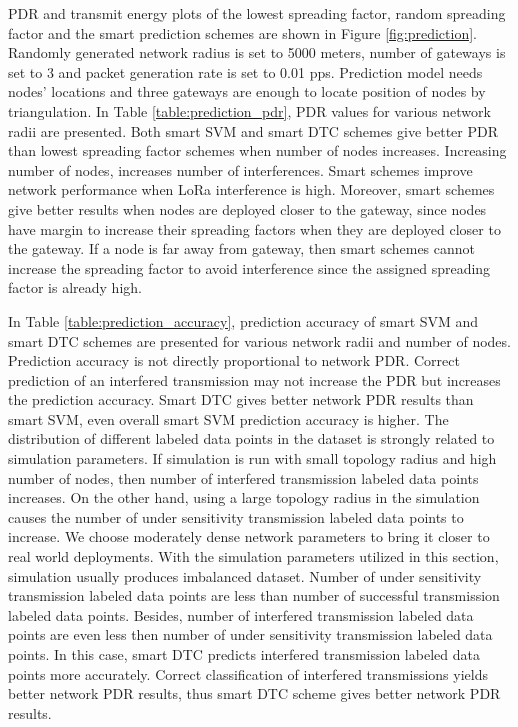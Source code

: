 PDR and transmit energy plots of the lowest spreading factor, random spreading factor and the smart prediction schemes are shown in Figure \ref{fig:prediction}. Randomly generated network radius is set to 5000 meters, number of gateways is set to 3 and packet generation rate is set to 0.01 pps. Prediction model needs nodes' locations and three gateways are enough to locate position of nodes by triangulation. In Table \ref{table:prediction_pdr}, PDR values for various network radii are presented. Both smart SVM and smart DTC schemes give better PDR than lowest spreading factor schemes when number of nodes increases. Increasing number of nodes, increases number of interferences. Smart schemes improve network performance when LoRa interference is high. Moreover, smart schemes give better results when nodes are deployed closer to the gateway, since nodes have margin to increase their spreading factors when they are deployed closer to the gateway. If a node is far away from gateway, then smart schemes cannot increase the spreading factor to avoid interference since the assigned spreading factor is already high.

In Table \ref{table:prediction_accuracy}, prediction accuracy of smart SVM and smart DTC schemes are presented for various network radii and number of nodes. Prediction accuracy is not directly proportional to network PDR. Correct prediction of an interfered transmission may not increase the PDR but increases the prediction accuracy. Smart DTC gives better network PDR results than smart SVM, even overall smart SVM prediction accuracy is higher. The distribution of different labeled data points in the dataset is strongly related to simulation parameters. If simulation is run with small topology radius and high number of nodes, then number of interfered transmission labeled data points increases. On the other hand, using a large topology radius in the simulation causes the number of under sensitivity transmission labeled data points to increase. We choose moderately dense network parameters to bring it closer to real world deployments. With the simulation parameters utilized in this section, simulation usually produces imbalanced dataset. Number of under sensitivity transmission labeled data points are less than number of successful transmission labeled data points. Besides, number of interfered transmission labeled data points are even less then number of under sensitivity transmission labeled data points. In this case, smart DTC predicts interfered transmission labeled data points more accurately. Correct classification of interfered transmissions yields better network PDR results, thus smart DTC scheme gives better network PDR results.

